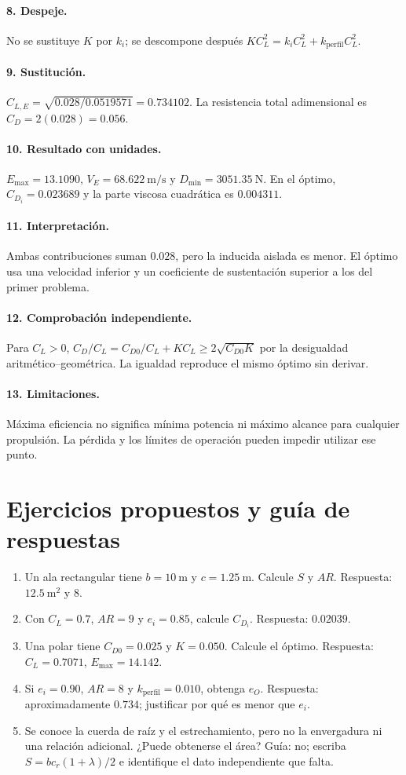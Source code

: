 \paragraph{8. Despeje.} No se sustituye $K$ por $k_i$; se descompone después $KC_L^2=k_iC_L^2+k_{\mathrm{perfil}}C_L^2$.
\paragraph{9. Sustitución.} $C_{L,E}=\sqrt{0.028/0.0519571}=0.734102$. La resistencia total adimensional es $C_D=2(0.028)=0.056$.
\paragraph{10. Resultado con unidades.} $E_{\max}=13.1090$, $V_E=68.622\ \mathrm{m/s}$ y $D_{\min}=3051.35\ \mathrm N$. En el óptimo, $C_{D_i}=0.023689$ y la parte viscosa cuadrática es $0.004311$.
\paragraph{11. Interpretación.} Ambas contribuciones suman $0.028$, pero la inducida aislada es menor. El óptimo usa una velocidad inferior y un coeficiente de sustentación superior a los del primer problema.
\paragraph{12. Comprobación independiente.} Para $C_L>0$, $C_D/C_L=C_{D0}/C_L+KC_L\geq2\sqrt{C_{D0}K}$ por la desigualdad aritmético--geométrica. La igualdad reproduce el mismo óptimo sin derivar.
\paragraph{13. Limitaciones.} Máxima eficiencia no significa mínima potencia ni máximo alcance para cualquier propulsión. La pérdida y los límites de operación pueden impedir utilizar ese punto.

\section{Ejercicios propuestos y guía de respuestas}
\begin{enumerate}
\item Un ala rectangular tiene $b=10\ \mathrm m$ y $c=1.25\ \mathrm m$. Calcule $S$ y $AR$. Respuesta: $12.5\ \mathrm{m^2}$ y $8$.
\item Con $C_L=0.7$, $AR=9$ y $e_i=0.85$, calcule $C_{D_i}$. Respuesta: $0.02039$.
\item Una polar tiene $C_{D0}=0.025$ y $K=0.050$. Calcule el óptimo. Respuesta: $C_L=0.7071$, $E_{\max}=14.142$.
\item Si $e_i=0.90$, $AR=8$ y $k_{\mathrm{perfil}}=0.010$, obtenga $e_O$. Respuesta: aproximadamente $0.734$; justificar por qué es menor que $e_i$.
\item Se conoce la cuerda de raíz y el estrechamiento, pero no la envergadura ni una relación adicional. ¿Puede obtenerse el área? Guía: no; escriba $S=bc_r(1+\lambda)/2$ e identifique el dato independiente que falta.
\end{enumerate}
